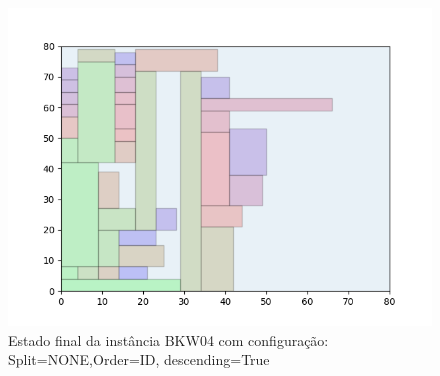 \begin{figure}[H]
    \centering
    \caption[]{Estado final da instância BKW04 com configuração: Split=NONE,Order=ID, descending=True}
    \label{fig:bkw04-none-id-true}
    \includegraphics[scale=0.5]{output/figures/bkw/bkw04/none/id/true/00}
\end{figure}